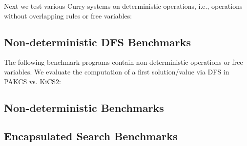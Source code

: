 \documentclass{article}
\begin{document}
Next we test various Curry systems on deterministic operations,
i.e., operations without overlapping rules or free variables:

\begin{center}
\end{center}

\subsection{Non-deterministic DFS Benchmarks}

The following benchmark programs contain non-deterministic operations
or free variables. We evaluate the computation of a
first solution/value via DFS in PAKCS vs. KiCS2:

\begin{center}
\end{center}

\subsection{Non-deterministic Benchmarks}

\begin{center}
\end{center}

\subsection{Encapsulated Search Benchmarks}

\begin{center}
\end{center}
\end{document}
